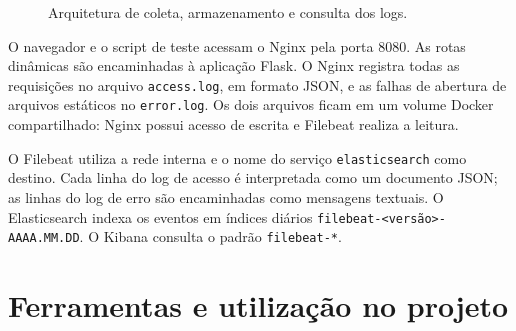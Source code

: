 \documentclass[10pt,a4paper]{article}
\begin{document}
\begin{figure}[H]
\centering
{}
\caption{Arquitetura de coleta, armazenamento e consulta dos logs.}
\label{fig:arquitetura}
\end{figure}

O navegador e o script de teste acessam o Nginx pela porta 8080. As rotas dinâmicas são encaminhadas à aplicação Flask. O Nginx registra todas as requisições no arquivo \texttt{access.log}, em formato JSON, e as falhas de abertura de arquivos estáticos no \texttt{error.log}. Os dois arquivos ficam em um volume Docker compartilhado: Nginx possui acesso de escrita e Filebeat realiza a leitura.

O Filebeat utiliza a rede interna e o nome do serviço \texttt{elasticsearch} como destino. Cada linha do log de acesso é interpretada como um documento JSON; as linhas do log de erro são encaminhadas como mensagens textuais. O Elasticsearch indexa os eventos em índices diários \texttt{filebeat-<versão>-AAAA.MM.DD}. O Kibana consulta o padrão \texttt{filebeat-*}.

\section{Ferramentas e utilização no projeto}
\end{document}
